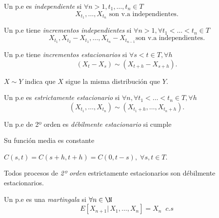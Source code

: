 \begin{ndef}
  Un p.e es \emph{independiente} si $\forall n > 1, t_1, \ldots, t_n \in T$ $$X_{t_1}, \ldots, X_{t_n} \text{ son v.a independientes.}$$
\end{ndef}

\begin{ndef}
  Un p.e tiene \emph{incrementos independientes} si $\forall n > 1, \forall t_1 < \ldots < t_n \in T$ $$X_{t_1}, X_{t_2} - X_{t_1}, \ldots, X_{t_n} - X_{t_{n-1}} \text{son v.a independientes.}$$
\end{ndef}

\begin{ndef}
  Un p.e tiene \emph{incrementos estacionarios} si $\forall s < t \in T, \forall h$  $$(X_t - X_s) \sim (X_{t+h} - X_{s+h}).$$
\end{ndef}

\begin{nota}
  $X \sim Y$ indica que $X$ sigue la misma distribución que $Y$.
\end{nota}

\begin{ndef}
  Un p.e es \emph{estrictamente estacionario} si $\forall n, \forall t_1 < \ldots < t_n \in T, \forall h$ $$(X_{t_1}, \ldots, X_{t_n}) \sim (X_{t_1 + h}, \ldots, X_{t_n + h}).$$
\end{ndef}

\begin{ndef}
  Un p.e de 2º orden es \emph{débilmente estacionario} si cumple
  \begin{nlist}
    \item Su función media es constante
    \item $C(s,t) = C(s+h, t+h) = C(0, t-s), \; \forall s,t \in T$.
  \end{nlist}
\end{ndef}

\begin{nota}
  Todos procesos de \emph{2º orden} estrictamente estacionarios son débilmente estacionarios.
\end{nota}

\begin{ndef}
  Un p.e es una \emph{martingala} si $\forall n \in \N$ $$E[X_{n+1} | \, X_1, \ldots, X_n] = X_n \; \; c.s$$
\end{ndef}

